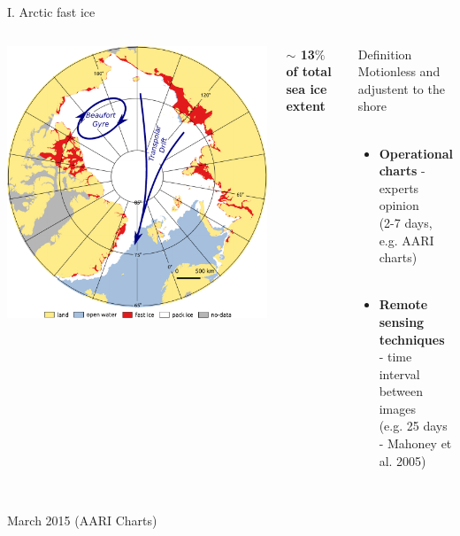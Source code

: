 \documentclass[8pt]{beamer}
\newcommand\Fontvi{\fontsize{6}{7.2}\selectfont}
\begin{document}
\setwatermark{\fontsize{125pt}{125pt}\selectfont{}}
\begin{frame}[fragile]{I. Arctic fast ice}
	\begin{columns}
		\includegraphics[width=1\textwidth]{./img/ArcticSI_Mar2015_circ.pdf}\\
				\begin{block}{\centering}
					\begin{center}
						\textbf{$\sim$ 13$\%$ of total sea ice extent}
					\end{center}
				\end{block}
				
				\begin{block}{\centering Definition}
					\centering
				Motionless and adjustent to the shore\\~\\
					\begin{itemize}
						\item \textbf{Operational charts} - experts opinion\\
						 (2-7 days, e.g. AARI charts)\\~\\
						\item \textbf{Remote sensing techniques}\\ - time interval between images\\
						 (e.g. 25 days - Mahoney et al. 2005)
					\end{itemize}
				\end{block}

	\end{columns}
~\\
\Fontvi
17 March 2015 (AARI Charts)
\end{frame}
\end{document}

